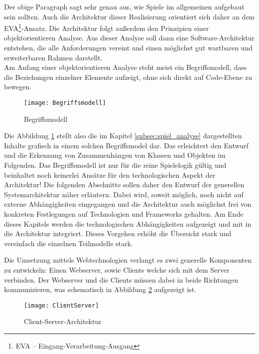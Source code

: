 Der obige Paragraph sagt sehr genau aus, wie Spiele im allgemeinen aufgebaut sein sollten. Auch die Architektur dieser Realisierung orientiert sich daher an dem EVA\footnote{EVA -- Eingang-Verarbeitung-Ausgang}-Ansatz. 
Die Architektur folgt außerdem den Prinzipien einer objektorientieren Analyse. Aus dieser Analyse soll dann eine Software-Architektur entstehen, die alle Anforderungen vereint und einen möglichst gut wartbaren und erweiterbaren Rahmen darstellt.\\
Am Anfang einer objektorientieren Analyse steht meist ein Begriffsmodell, dass die Beziehungen einzelner Elemente aufzeigt, ohne sich direkt auf Code-Ebene zu bewegen. 
\begin{figure}[h]
	\centering
	\captionsetup{justification=centering}
	\texttt{[image: Begriffsmodell]}
	\caption[Begriffsmodell]{Begriffsmodell}
	\label{fig:Begriffsmodell}
\end{figure}
Die Abbildung \ref{fig:Begriffsmodell} stellt also die im Kapitel \ref{subsec:spiel_analyse} dargestellten Inhalte grafisch in einem solchen Begriffsmodel dar. Das erleichtert den Entwurf und die Erkennung von Zusammenhängen von Klassen und Objekten im Folgenden. Das Begriffsmodell ist nur für die reine Spielelogik gültig und beinhaltet noch keinerlei Ansätze für den technologischen Aspekt der Architektur! Die folgenden Abschnitte sollen daher den Entwurf der generellen Systemarchitektur näher erläutern. Dabei wird, soweit möglich, noch nicht auf externe Abhängigkeiten eingegangen und die Architektur auch möglichst frei von konkreten Festlegungen auf Technologien und Frameworks gehalten. Am Ende dieses Kapitels werden die technologischen Abhängigkeiten aufgezeigt und mit in die Architektur integriert. Dieses Vorgehen erhöht die Übersicht stark und vereinfach die einzelnen Teilmodelle stark.

\noindent Die Umsetzung mittels Webtechnologien verlangt es zwei generelle Komponenten zu entwickeln: Einen Webserver, sowie Clients welche sich mit dem Server verbinden.
Der Webserver und die Clients müssen dabei in beide Richtungen kommunizieren, was schematisch in Abbildung \ref{fig:Client-Server-Architektur} aufgezeigt ist.

\begin{figure}[htp]
	\centering
	\captionsetup{justification=centering}
	\texttt{[image: ClientServer]}
	\caption[Client-Server-Architektur]{Client-Server-Architektur}
	\label{fig:Client-Server-Architektur}
\end{figure}

